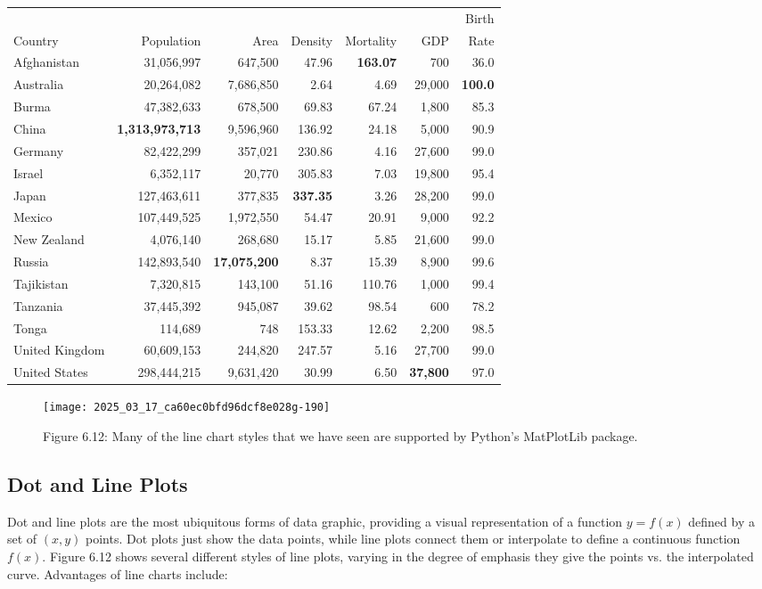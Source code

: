 \documentclass[10pt]{article}
\begin{document}
\begin{table}[h!]
\centering
\begin{tabular}{l|rrrrrr}
 &  &  &  &  &  & Birth \\
Country & Population & Area & Density & Mortality & GDP & Rate \\
\hline
Afghanistan & 31,056,997 & 647,500 & 47.96 & \textbf{163.07} & 700 & 36.0 \\
Australia & 20,264,082 & 7,686,850 & 2.64 & 4.69 & 29,000 & \textbf{100.0} \\
Burma & 47,382,633 & 678,500 & 69.83 & 67.24 & 1,800 & 85.3 \\
China & \textbf{1,313,973,713} & 9,596,960 & 136.92 & 24.18 & 5,000 & 90.9 \\
Germany & 82,422,299 & 357,021 & 230.86 & 4.16 & 27,600 & 99.0 \\
Israel & 6,352,117 & 20,770 & 305.83 & 7.03 & 19,800 & 95.4 \\
Japan & 127,463,611 & 377,835 & \textbf{337.35} & 3.26 & 28,200 & 99.0 \\
Mexico & 107,449,525 & 1,972,550 & 54.47 & 20.91 & 9,000 & 92.2 \\
New Zealand & 4,076,140 & 268,680 & 15.17 & 5.85 & 21,600 & 99.0 \\
Russia & 142,893,540 & \textbf{17,075,200} & 8.37 & 15.39 & 8,900 & 99.6 \\
Tajikistan & 7,320,815 & 143,100 & 51.16 & 110.76 & 1,000 & 99.4 \\
Tanzania & 37,445,392 & 945,087 & 39.62 & 98.54 & 600 & 78.2 \\
Tonga & 114,689 & 748 & 153.33 & 12.62 & 2,200 & 98.5 \\
United Kingdom & 60,609,153 & 244,820 & 247.57 & 5.16 & 27,700 & 99.0 \\
United States & 298,444,215 & 9,631,420 & 30.99 & 6.50 & \textbf{37,800} & 97.0 \\
\hline
\end{tabular}
\end{table}

\begin{figure}[h!]
\centering
\texttt{[image: 2025\_03\_17\_ca60ec0bfd96dcf8e028g-190]}
\caption{Figure 6.12: Many of the line chart styles that we have seen are supported by Python's MatPlotLib package.}
\end{figure}

\subsection*{Dot and Line Plots}
Dot and line plots are the most ubiquitous forms of data graphic, providing a visual representation of a function \( y=f(x) \) defined by a set of \((x, y)\) points. Dot plots just show the data points, while line plots connect them or interpolate to define a continuous function \( f(x) \). Figure 6.12 shows several different styles of line plots, varying in the degree of emphasis they give the points vs. the interpolated curve. Advantages of line charts include:
\end{document}
